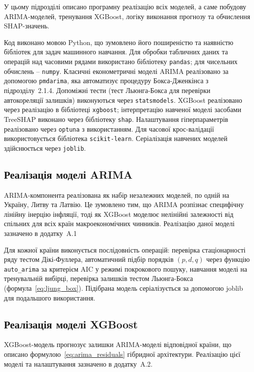 \documentclass{bachelor_thesis}
\begin{document}
У цьому підрозділі описано програмну реалізацію всіх моделей, а саме побудову ARIMA-моделей, тренування XGBoost, логіку виконання прогнозу та обчислення SHAP-значень.

Код виконано мовою Python, що зумовлено його поширеністю та наявністю бібліотек для задач машинного навчання. Для обробки табличних даних та операцій над часовими рядами використано бібліотеку \texttt{pandas}; для чисельних обчислень -- \texttt{numpy}. Класичні економетричні моделі ARIMA реалізовано за допомогою \texttt{pmdarima}, яка автоматизує процедуру Бокса-Дженкінса з підрозділу~2.1.4. Допоміжні тести (тест Льюнга-Бокса для перевірки автокореляції залишків) виконуються через \texttt{statsmodels}. XGBoost реалізовано через реалізацію в бібліотеці \texttt{xgboost}; інтерпретацію навченої моделі засобами TreeSHAP виконано через бібліотеку \texttt{shap}. Налаштування гіперпараметрів реалізовано через \texttt{optuna} з використанням. Для часової крос-валідації використовується бібліотека \texttt{scikit-learn}. Серіалізація навчених моделей здійснюється через \texttt{joblib}.

\subsection{Реалізація моделі ARIMA}

ARIMA-компонента реалізована як набір незалежних моделей, по одній на Україну, Литву та Латвію. Це зумовлено тим, що ARIMA розпізнає специфічну лінійну інерцію інфляції, тоді як XGBoost моделює нелінійні залежності від спільних для всіх країн макроекономічних чинників. Реалізацію даної моделі зазначено в додатку~A.1

Для кожної країни виконується послідовність операцій: перевірка стаціонарності ряду тестом Дікі-Фуллера, автоматичний підбір порядків $(p, d, q)$ через функцію \texttt{auto\_arima} за критерієм AIC у режимі покрокового пошуку, навчання моделі на тренувальній вибірці, перевірка залишків тестом Льюнга-Бокса (формула~\eqref{eq:ljung_box}). Підібрана модель серіалізується за допомогою joblib для подальшого використання.

\subsection{Реалізація моделі XGBoost}

XGBoost-модель прогнозує залишки ARIMA-моделі відповідної країни, що описано формулою~\eqref{eq:arima_residuals} гібридної архітектури. Реалізацію цієї моделі та налаштування зазначено в додатку~A.2.
\end{document}
